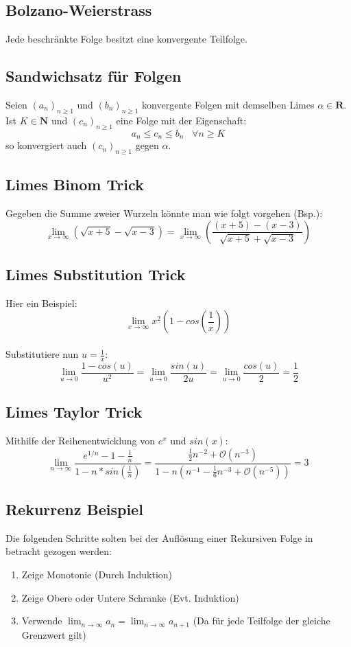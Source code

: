 \documentclass[8pt]{article}
\begin{document}
\begin{multicols*}{3}
 \subsection{Bolzano-Weierstrass}
Jede beschränkte Folge besitzt eine konvergente Teilfolge.
  \subsection {Sandwichsatz für Folgen}
Seien $(a_n)_{n \geq 1}$ und $(b_n)_{n \geq 1}$ konvergente Folgen mit demselben Limes
$\alpha \in \mathbf{R}$. Ist $K \in \mathbf{N}$ und $(c_n)_{n \geq 1}$ eine Folge
mit der Eigenschaft: $$a_n \leq c_n \leq b_n \; \; \; \forall n \geq K$$ so konvergiert
auch $(c_n)_{n \geq 1}$ gegen $\alpha$.
  \subsection{Limes Binom Trick}
Gegeben die Summe zweier Wurzeln könnte man wie folgt
vorgehen (Bsp.):
$$
  \lim_{x \rightarrow \infty} (\sqrt{x + 5} - \sqrt{x - 3}) = \lim_{x \rightarrow \infty} (\frac{(x + 5) - (x - 3)}{\sqrt{x + 5} + \sqrt{x - 3}})
$$
  \subsection{Limes Substitution Trick}
Hier ein Beispiel:
$$
  \lim_{x \rightarrow \infty} x^2 (1 - cos(\frac{1}{x}))
$$\\
Substitutiere nun $u = \frac{1}{x}$:
$$
\lim_{u \rightarrow 0} \frac{1 - cos(u)}{u^2} = \lim_{u \rightarrow 0} \frac{sin(u)}{2u} = \lim_{u \rightarrow 0} \frac{cos(u)}{2} = \frac{1}{2}
$$

  \subsection{Limes Taylor Trick}

Mithilfe der Reihenentwicklung von $e^x$ und $sin(x)$:
$$
\lim_{n \rightarrow \infty} \frac{e^{1/n} - 1 - \frac{1}{n}}{1 - n * sin(\frac{1}{n})} = \frac{\frac{1}{2}n^{-2} + \mathcal{O}(n^{-3})}{1 - n(n^{-1} - \frac{1}{6}n^{-3} + \mathcal{O}(n^{-5}))} = 3
$$

  \subsection {Rekurrenz Beispiel}
Die folgenden Schritte solten bei der Auflösung einer Rekursiven Folge in betracht gezogen werden:
\begin{enumerate}
  \item Zeige Monotonie (Durch Induktion)
  \item Zeige Obere oder Untere Schranke (Evt. Induktion)
  \item Verwende $\lim_{n \rightarrow \infty} a_n = \lim_{n \rightarrow \infty} a_{n + 1}$ (Da für jede Teilfolge der gleiche Grenzwert gilt)
\end{enumerate}

\end{multicols*}
\end{document}
